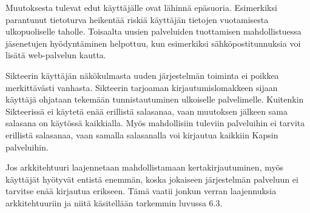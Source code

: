 Muutoksesta tulevat edut käyttäjälle ovat lähinnä epäsuoria. Esimerkiksi parantunut tietoturva heikentää riskiä käyttäjän tietojen vuotamisesta ulkopuoliselle taholle. Toisaalta uusien palveluiden tuottamisen mahdollistuessa jäsenetujen hyödyntäminen helpottuu, kun esimerkiksi sähköpostitunnuksia voi lisätä web-palvelun kautta.

Sikteerin käyttäjän näkökulmasta uuden järjestelmän toiminta ei poikkea merkittävästi vanhasta. Sikteerin tarjoaman kirjautumislomakkeen sijaan käyttäjä ohjataan tekemään tunnistautuminen ulkoiselle palvelimelle. Kuitenkin Sikteerissä ei käytetä enää erillistä salasanaa, vaan muutoksen jälkeen sama salasana on käytössä kaikkialla. Myös mahdollisiin tuleviin palveluihin ei tarvita erillistä salasanaa, vaan samalla salasanalla voi kirjautua kaikkiin Kapsin palveluihin.

Jos arkkitehtuuri laajennetaan mahdollistamaan kertakirjautuminen, myös käyttäjät hyötyvät entistä enemmän, koska jokaiseen järjestelmän palveluun ei tarvitse enää kirjautua erikseen. Tämä vaatii jonkun verran laajennuksia arkkitehtuuriin ja niitä käsitellään tarkemmin luvussa 6.3.
